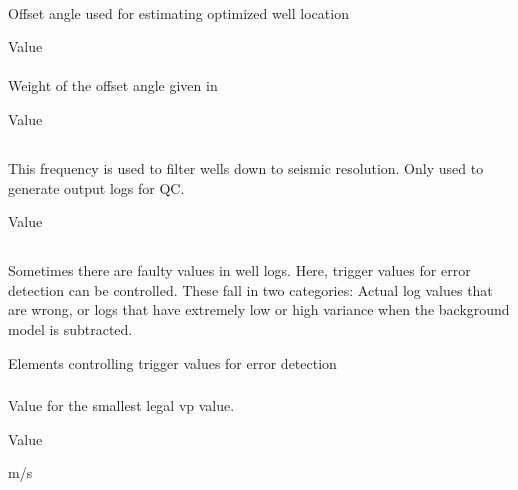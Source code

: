 \paragraph{}
 \slist
    \item \Description Offset angle used for estimating optimized well location
    \item \Argument Value
    \item \Default
 \elist

\paragraph{}
 \slist
    \item \Description Weight of the offset angle given in 
    \item \Argument Value
    \item {}
 \elist

\subsection{}
 \slist
   \item \Description This frequency is used to filter wells down to seismic resolution. Only used to generate output logs for QC.
   \item \Argument Value
   \item \Default
 \elist

\subsection{}
 \slist
   \item \Description Sometimes there are faulty values in well logs. Here, trigger values for error detection can be controlled. These fall in two categories: Actual log values that are wrong, or logs that have extremely low or high variance when the background model is subtracted.
   \item \Argument Elements controlling trigger values for error detection
   \item \Default
 \elist

\subsubsection{}
 \slist
   \item \Description Value for the smallest legal vp value.
   \item \Argument Value
   \item {} m/s
 \elist

